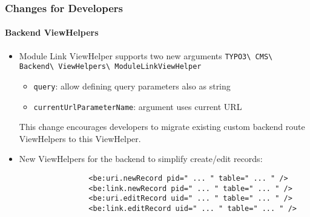\begin{frame}[fragile]
	\frametitle{Changes for Developers}
	\framesubtitle{Backend ViewHelpers}


	\begin{itemize}
		\item Module Link ViewHelper supports two new arguments\newline
			\small
				\texttt{TYPO3\textbackslash
					CMS\textbackslash
					Backend\textbackslash
					ViewHelpers\textbackslash
					ModuleLinkViewHelper}
			\normalsize

			\begin{itemize}
				\small
				\item \texttt{query}: allow defining query parameters also as string
				\item \texttt{currentUrlParameterName}: argument uses current URL
			\end{itemize}

			This change encourages developers to migrate existing custom backend route
			ViewHelpers to this ViewHelper.

		\item New ViewHelpers for the backend to simplify create/edit records:

			\begin{lstlisting}
				<be:uri.newRecord pid=" ... " table=" ... " />
				<be:link.newRecord pid=" ... " table=" ... " />
				<be:uri.editRecord uid=" ... " table=" ... " />
				<be:link.editRecord uid=" ... " table=" ... " />
			\end{lstlisting}

	\end{itemize}

\end{frame}


